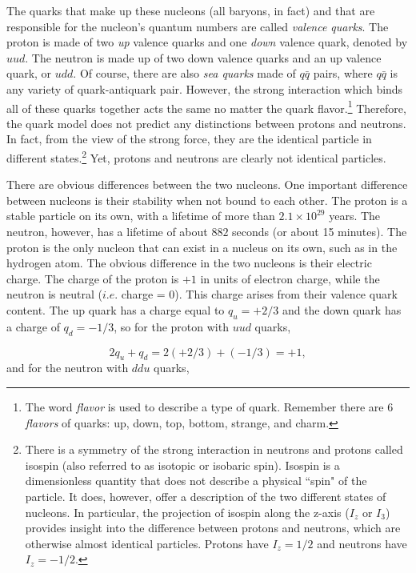 The quarks that make up these nucleons (all baryons, in fact) and that are responsible for the nucleon's quantum numbers are called \textit{valence quarks}. The proton is made of two \textit{up} valence quarks and one \textit{down} valence quark, denoted by $uud$. The neutron is made up of two down valence quarks and an up valence quark, or $udd$. Of course, there are also \textit{sea quarks} made of $q\bar{q}$ pairs, where $q\bar{q}$ is any variety of quark-antiquark pair. However, the strong interaction which binds all of these quarks together acts the same no matter the quark flavor.\footnote{The word \textit{flavor} is used to describe a type of quark. Remember there are 6 \textit{flavors} of quarks: up, down, top, bottom, strange, and charm.} Therefore, the quark model does not predict any distinctions between protons and neutrons. In fact, from the view of the strong force, they are the identical particle in different states.\footnote{There is a symmetry of the strong interaction in neutrons and protons called isospin (also referred to as isotopic or isobaric spin). Isospin is a dimensionless quantity that does not describe a physical ``spin" of the particle. It does, however, offer a description of the two different states of nucleons. In particular, the projection of isospin along the z-axis ($I_z$ or $I_3$) provides insight into the difference between protons and neutrons, which are otherwise almost identical particles. Protons have $I_z=1/2$ and neutrons have $I_z=-1/2$.} Yet, protons and neutrons are clearly not identical particles.

There are obvious differences between the two nucleons. One important difference between nucleons is their stability when not bound to each other. The proton is a stable particle on its own, with a lifetime of more than $2.1 \times 10^{29}$ years. The neutron, however, has a lifetime of about $882$ seconds (or about 15 minutes). The proton is the only nucleon that can exist in a nucleus on its own, such as in the hydrogen atom. The obvious difference in the two nucleons is their electric charge. The charge of the proton is $+1$ in units of electron charge, while the neutron is neutral ($i.e.$ charge = 0). This charge arises from their valence quark content. The up quark has a charge equal to $q_u = +2/3$ and the down quark has a charge of $q_d = -1/3$, so for the proton with $uud$ quarks,

\begin{equation}
2q_u + q_d = 2(+2/3) + (-1/3) = +1,
\end{equation}
and for the neutron with $ddu$ quarks,

